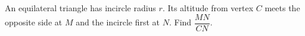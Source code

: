 An equilateral triangle has incircle radius $r$. Its altitude from vertex $C$ meets the opposite side at $M$ and the incircle first at $N$. Find $\dfrac{MN}{CN}$.
